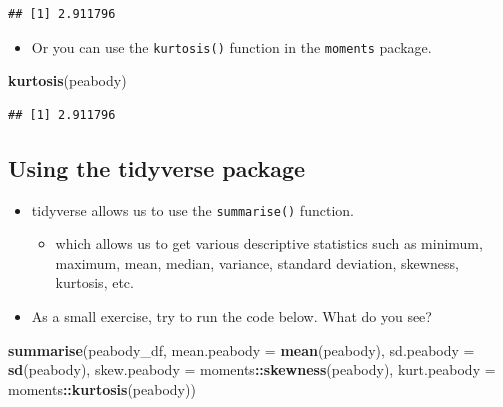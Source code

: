 \documentclass[
]{book}
\newenvironment{Shaded}{\begin{snugshade}}{\end{snugshade}}
\newcommand{\AttributeTok}[1]{\textcolor[rgb]{0.13,0.29,0.53}{#1}}
\newcommand{\FunctionTok}[1]{\textcolor[rgb]{0.13,0.29,0.53}{\textbf{#1}}}
\newcommand{\NormalTok}[1]{#1}
\newcommand{\SpecialCharTok}[1]{\textcolor[rgb]{0.81,0.36,0.00}{\textbf{#1}}}
\providecommand{\tightlist}{%
  \setlength{\itemsep}{0pt}\setlength{\parskip}{0pt}}
\begin{document}
\begin{verbatim}
## [1] 2.911796
\end{verbatim}

\begin{itemize}
\tightlist
\item
  Or you can use the \texttt{kurtosis()} function in the \texttt{moments} package.
\end{itemize}

\begin{Shaded}
\begin{Highlighting}[]
\FunctionTok{kurtosis}\NormalTok{(peabody)}
\end{Highlighting}
\end{Shaded}

\begin{verbatim}
## [1] 2.911796
\end{verbatim}

\subsection{Using the tidyverse package}\label{using-the-tidyverse-package}

\begin{itemize}
\tightlist
\item
  tidyverse allows us to use the \texttt{summarise()} function.

  \begin{itemize}
  \tightlist
  \item
    which allows us to get various descriptive statistics such as minimum, maximum, mean, median, variance, standard deviation, skewness, kurtosis, etc.
  \end{itemize}
\item
  As a small exercise, try to run the code below. What do you see?
\end{itemize}

\begin{Shaded}
\begin{Highlighting}[]
\FunctionTok{summarise}\NormalTok{(peabody\_df,}
          \AttributeTok{mean.peabody =} \FunctionTok{mean}\NormalTok{(peabody),}
          \AttributeTok{sd.peabody =} \FunctionTok{sd}\NormalTok{(peabody),}
          \AttributeTok{skew.peabody =}\NormalTok{ moments}\SpecialCharTok{::}\FunctionTok{skewness}\NormalTok{(peabody),}
          \AttributeTok{kurt.peabody =}\NormalTok{ moments}\SpecialCharTok{::}\FunctionTok{kurtosis}\NormalTok{(peabody))}
\end{Highlighting}
\end{Shaded}
\end{document}
